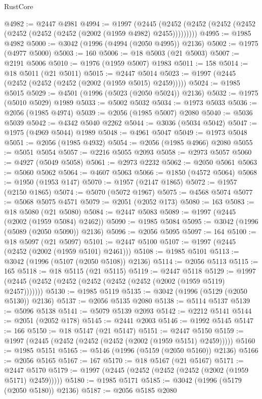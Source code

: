 \begin{lexlean}{RustCore}
\begin{coremodule}
@4982 := @2447 @4981
@4994 := @1997
    (@2445 (@2452 (@2452 (@2452 (@2452 (@2452 (@2452 (@2452 (@2002 (@1959 @4982) @2455)))))))))
@4995 := @1985 @4982
@5000 := @3042 (@1996 (@4994 (@2050 @4995)) @2136)
@5002 := @1975 (@4977 @5000)
@5003 := 160
@5006 := @18 @5003 (@21 @5003)
@5007 := @2191 @5006
@5010 := @1976 (@1959 @5007) @1983
@5011 := 158
@5014 := @18 @5011 (@21 @5011)
@5015 := @2447 @5014
@5023 := @1997 (@2445 (@2452 (@2452 (@2452 (@2002 (@1959 @5015) @2459)))))
@5024 := @1985 @5015
@5029 := @4501 (@1996 (@5023 (@2050 @5024)) @2136)
@5032 := @1975 (@5010 @5029) @1989
@5033 := @5002 @5032
@5034 := @1973 @5033
@5036 := @2056 (@1985 @4974)
@5039 := @2056 (@1985 @5007) @2080
@5040 := @5036 @5039
@5042 := @4342 @5040 @2262
@5044 := @3036 (@5034 @5042)
@5047 := @1975 (@4969 @5044) @1989
@5048 := @4961 @5047
@5049 := @1973 @5048
@5051 := @2056 (@1985 @4932)
@5054 := @2056 (@1985 @4966) @2080
@5055 := @5051 @5054
@5057 := @2216 @5055 @2093
@5058 := @2973 @5057
@5060 := @4927 (@5049 @5058)
@5061 := @2973 @2232
@5062 := @2050 @5061
@5063 := @5060 @5062
@5064 := @4607 @5063
@5066 := @1850 (@4572 @5064)
@5068 := @1950 (@1953 @147)
@5070 := @1957 (@2147 @1865)
@5072 := @1957 (@2150 @1865)
@5074 := @5070 (@5072 @1967)
@5075 := @4568 @5074
@5077 := @5068 @5075 @4571
@5079 := @2051 (@2052 @173)
@5080 := 163
@5083 := @18 @5080 (@21 @5080)
@5084 := @2447 @5083
@5089 := @1997 (@2445 (@2002 (@1959 @5084) @2462))
@5090 := @1985 @5084
@5095 := @3042 (@1996 (@5089 (@2050 @5090)) @2136)
@5096 := @2056 @5095
@5097 := 164
@5100 := @18 @5097 (@21 @5097)
@5101 := @2447 @5100
@5107 := @1997 (@2445 (@2452 (@2002 (@1959 @5101) @2461)))
@5108 := @1985 @5101
@5113 := @3042 (@1996 (@5107 (@2050 @5108)) @2136)
@5114 := @2056 @5113
@5115 := 165
@5118 := @18 @5115 (@21 @5115)
@5119 := @2447 @5118
@5129 := @1997 (@2445 (@2452 (@2452 (@2452 (@2452 (@2452 (@2002 (@1959 @5119) @2457)))))))
@5130 := @1985 @5119
@5135 := @3042 (@1996 (@5129 (@2050 @5130)) @2136)
@5137 := @2056 @5135 @2080
@5138 := @5114 @5137
@5139 := @5096 @5138
@5141 := @5079 @5139 @2093
@5142 := @2212 @5141
@5144 := @2051 (@2052 @178)
@5145 := @2441 @2003
@5146 := @1992 @5145
@5147 := 166
@5150 := @18 @5147 (@21 @5147)
@5151 := @2447 @5150
@5159 := @1997 (@2445 (@2452 (@2452 (@2452 (@2002 (@1959 @5151) @2459)))))
@5160 := @1985 @5151
@5165 := @5146 (@1996 (@5159 (@2050 @5160)) @2136)
@5166 := @2056 @5165
@5167 := 167
@5170 := @18 @5167 (@21 @5167)
@5171 := @2447 @5170
@5179 := @1997 (@2445 (@2452 (@2452 (@2452 (@2002 (@1959 @5171) @2459)))))
@5180 := @1985 @5171
@5185 := @3042 (@1996 (@5179 (@2050 @5180)) @2136)
@5187 := @2056 @5185 @2080

\end{coremodule}
\end{lexlean}
